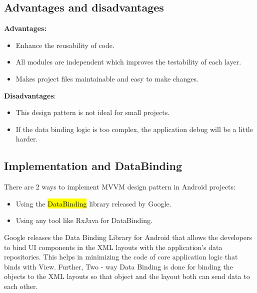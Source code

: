 \subsection{Advantages and disadvantages}
\textbf{Advantages:}
\begin{itemize}
    \item Enhance the reusability of code.
    \item All modules are independent which improves the testability of each layer.
    \item Makes project files maintainable and easy to make changes.
\end{itemize}

\textbf{Disadvantages}:
\begin{itemize}
    \item This design pattern is not ideal for small projects.
    \item If the data binding logic is too complex, the application 
    debug will be a little harder.
\end{itemize}

\subsection{Implementation and DataBinding}
There are 2 ways to implement MVVM design pattern in Android projects:
\begin{itemize}
    \item Using the \hl{DataBinding} library released by Google.
    \item Using any tool like RxJava for DataBinding. 
\end{itemize}

Google releases the Data Binding Library for Android that allows the developers 
to bind UI components in the XML layouts with the application's data repositories. 
This helps in minimizing the code of core application logic that binds with View. 
Further, Two - way Data Binding is done for binding the objects to the XML layouts 
so that object and the layout both can send data to each other. 




